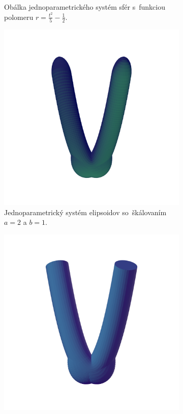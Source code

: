 \begin{figure}[h]
\begin{subfigure}[t]{0.49\textwidth}
        	\caption{Obálka jednoparametrického systém sfér s~funkciou polomeru $r=\frac{t^2}{5}-\frac{1}{2}$.}
        \label{fig:plocha4}
    \end{subfigure}
    \begin{subfigure}[t]{0.49\textwidth}
        \centering
        \includegraphics[width=\textwidth, trim=0mm 50mm 0mm 50mm, clip=true]{images/bienert_ellipsoids.png}
		\caption{Jednoparametrický systém elipsoidov so~škálovaním $a=2$ a $b=1$.}
        \label{fig:plocha5}
    \end{subfigure}
    \hfill
    \begin{subfigure}[t]{0.49\textwidth}
        \centering
        \includegraphics[width=\textwidth, trim=0mm 50mm 0mm 100mm, clip=true]{images/bienert_ellipsoids_envelope.png}

\end{subfigure}
\end{figure}
